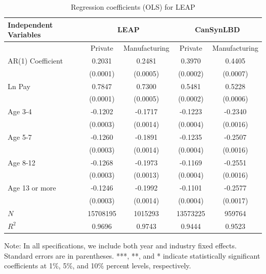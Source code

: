 \begin{table}[H]
  \centering
\begin{threeparttable}
 \caption{Regression coefficients (OLS) for LEAP} \label{tab:OLS_can} \medskip
\renewcommand{\arraystretch}{1}
\begin{tabular}{l|c c| c c}
\toprule
\textbf{Independent Variables}&\multicolumn{2}{c|}{\textbf{LEAP}} &  \multicolumn{2}{c}{\textbf{CanSynLBD}}\\
\midrule
&\multicolumn{1}{c}{Private}&\multicolumn{1}{c}{Manufacturing}&\multicolumn{1}{c}{Private}&\multicolumn{1}{c}{Manufacturing}\\
\hline
AR(1) Coefficient&   0.2031\sym{***}&   0.2481\sym{***}&   0.3970\sym{***}&   0.4405\sym{***}\\
          & (0.0001)         & (0.0005)         & (0.0002)         & (0.0007)         \\
[1em]
Ln Pay    &   0.7847\sym{***}&   0.7300\sym{***}&   0.5481\sym{***}&   0.5228\sym{***}\\
          & (0.0001)         & (0.0005)         & (0.0002)         & (0.0006)         \\
[1em]
Age 3-4   &  -0.1202\sym{***}&  -0.1717\sym{***}&  -0.1223\sym{***}&  -0.2340\sym{***}\\
          & (0.0003)         & (0.0014)         & (0.0004)         & (0.0016)         \\
[1em]
Age 5-7   &  -0.1260\sym{***}&  -0.1891\sym{***}&  -0.1235\sym{***}&  -0.2507\sym{***}\\
          & (0.0003)         & (0.0014)         & (0.0004)         & (0.0016)         \\
[1em]
Age 8-12  &  -0.1268\sym{***}&  -0.1973\sym{***}&  -0.1169\sym{***}&  -0.2551\sym{***}\\
          & (0.0003)         & (0.0013)         & (0.0004)         & (0.0016)         \\
[1em]
Age 13 or more&  -0.1246\sym{***}&  -0.1992\sym{***}&  -0.1101\sym{***}&  -0.2577\sym{***}\\
          & (0.0003)         & (0.0014)         & (0.0004)         & (0.0017)         \\
\hline
\(N\)     & 15708195         &  1015293         & 13573225         &   959764         \\
\(R^{2}\) &   0.9696         &   0.9743         &   0.9444         &   0.9523         \\
 \bottomrule
\end{tabular} 
\begin{tablenotes}
\small
\item Note: In all specifications, we include both year and industry fixed effects. Standard errors are in parentheses.  ***, **, and * indicate statistically significant coefficients at 1\%, 5\%, and 10\% percent levels, respectively.
 \end{tablenotes}
 \end{threeparttable}
\end{table}

